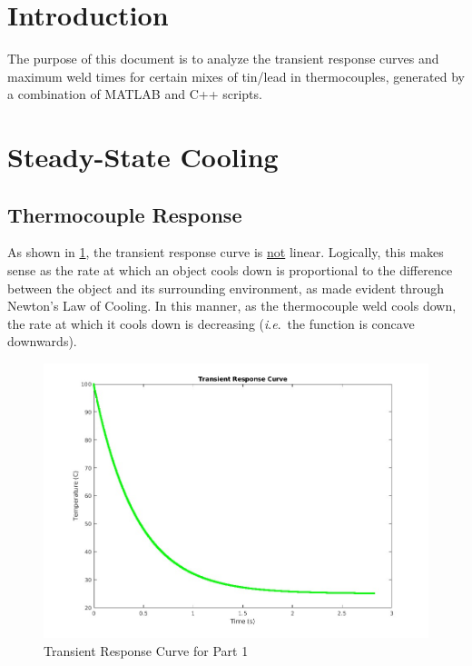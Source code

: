\documentclass[letterpaper,11pt]{texMemo} %
\begin{document}
\maketitle %


\section*{Introduction}

The purpose of this document is to analyze the transient response curves and maximum weld times for certain mixes of tin/lead in thermocouples, generated by a combination of MATLAB and C++ scripts.

\section*{Steady-State Cooling}

\subsection*{Thermocouple Response}

As shown in \ref{fig:1}, the transient response curve is \underline{not} linear. Logically, this makes sense as the rate at which an object cools down is proportional to the difference between the object and its surrounding environment, as made evident through Newton's Law of Cooling. In this manner, as the thermocouple weld cools down, the rate at which it cools down is decreasing (\textit{i}.\textit{e}.\ the function is concave downwards).

\begin{figure}[H]
  \centering
  \includegraphics[width=.6\textwidth]{1TRC.jpg}
  \caption{Transient Response Curve for Part 1}
  \label{fig:1}
\end{figure}
\end{document}
